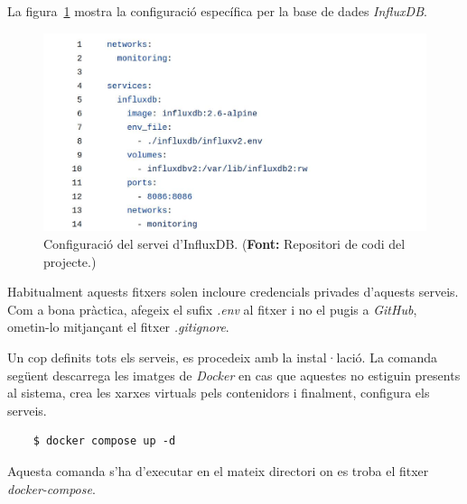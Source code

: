 \clearpage

\noindent
La figura~\ref{fig:docker-compose-influxdb} mostra la configuració específica per la base de dades \textit{InfluxDB}.

\begin{figure}[htbp]
    \centerline{\includegraphics[width=\textwidth]{figures/docker-compose-influxdb}}
    \captionsetup{justification=centering}
    \caption[Configuració del servei d'InfluxDB.]{Configuració del servei d'InfluxDB. (\textbf{Font:} Repositori de codi del projecte.)}\label{fig:docker-compose-influxdb}
\end{figure}

\begin{tcolorbox}[colback=blue!5!white, colframe=blue!75!black, title=Fitxers de configuració]
    Habitualment aquests fitxers solen incloure credencials privades d'aquests serveis.
    Com a bona pràctica, afegeix el sufix \textit{.env} al fitxer i no el pugis a \textit{\gls{GitHub}}, ometin-lo mitjançant el fitxer \textit{.\gls{gitignore}}.
\end{tcolorbox}
\vspace{1em}

\noindent
Un cop definits tots els serveis, es procedeix amb la instal·lació.
La comanda següent descarrega les imatges de \textit{\gls{Docker}} en cas que aquestes no estiguin presents al sistema,
crea les xarxes virtuals pels contenidors i finalment, configura els serveis.

\begin{verbatim}
    $ docker compose up -d
\end{verbatim}

\begin{tcolorbox}[colback=red!5!white, colframe=red!75!black, title=Atenció]
    Aquesta comanda s'ha d'executar en el mateix directori on es troba el fitxer \textit{\gls{docker-compose}}.
\end{tcolorbox}

